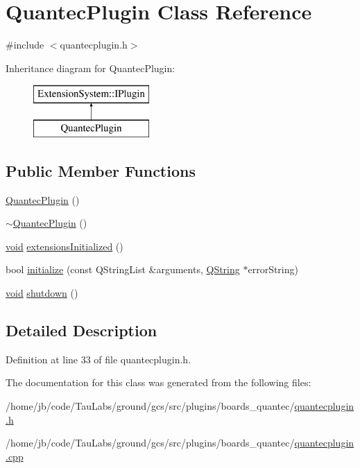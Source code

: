 \hypertarget{class_quantec_plugin}{\section{\-Quantec\-Plugin \-Class \-Reference}
\label{class_quantec_plugin}
}


{\ttfamily \#include $<$quantecplugin.\-h$>$}

\-Inheritance diagram for \-Quantec\-Plugin\-:\begin{figure}[H]
\begin{center}
\leavevmode
\includegraphics[height=2.000000cm]{class_quantec_plugin}
\end{center}
\end{figure}
\subsection*{\-Public \-Member \-Functions}
\begin{DoxyCompactItemize}
\item 
\hyperlink{group___boards___quantec_ga7e395a732723522846429499416b6660}{\-Quantec\-Plugin} ()
\item 
\hyperlink{group___boards___quantec_ga479a3e531eb28d6b2933cba448e348ba}{$\sim$\-Quantec\-Plugin} ()
\item 
\hyperlink{group___u_a_v_objects_plugin_ga444cf2ff3f0ecbe028adce838d373f5c}{void} \hyperlink{group___boards___quantec_ga947364f26b2004a6f8706e053e9200c9}{extensions\-Initialized} ()
\item 
bool \hyperlink{group___boards___quantec_ga74803b604ba599f20ee7a45dddbd7ead}{initialize} (const \-Q\-String\-List \&arguments, \hyperlink{group___u_a_v_objects_plugin_gab9d252f49c333c94a72f97ce3105a32d}{\-Q\-String} $\ast$error\-String)
\item 
\hyperlink{group___u_a_v_objects_plugin_ga444cf2ff3f0ecbe028adce838d373f5c}{void} \hyperlink{group___boards___quantec_ga775ecc021e3638b3652f5e49edd2f748}{shutdown} ()
\end{DoxyCompactItemize}


\subsection{\-Detailed \-Description}


\-Definition at line 33 of file quantecplugin.\-h.



\-The documentation for this class was generated from the following files\-:\begin{DoxyCompactItemize}
\item 
/home/jb/code/\-Tau\-Labs/ground/gcs/src/plugins/boards\-\_\-quantec/\hyperlink{quantecplugin_8h}{quantecplugin.\-h}\item 
/home/jb/code/\-Tau\-Labs/ground/gcs/src/plugins/boards\-\_\-quantec/\hyperlink{quantecplugin_8cpp}{quantecplugin.\-cpp}\end{DoxyCompactItemize}
